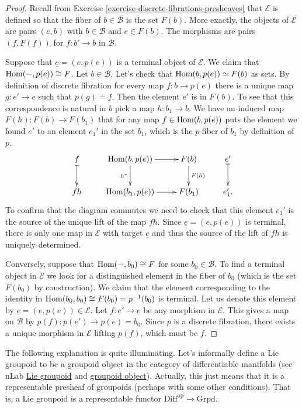 \begin{proof}
Recall from Exercise \ref{exercise-discrete-fibrations-presheaves}
that $\mathcal{E}$ is defined so that the fiber of $b \in \mathcal{B}$ 
is the set $F(b)$. More exactly, the objects of $\mathcal{E}$
are pairs $(e,b)$ with $b \in \mathcal{B}$ and $e \in F(b)$.
The morphisms are pairs $(f,F(f))$ for $f:b' \to b$ in $\mathcal{B}$.

Suppose that $\underline{e}=(e,p(e))$ is a terminal object of $\mathcal{E}$.
We claim that $\mathop{\mathrm{Hom}}\nolimits(-,p(e))\cong F$.
Let $b \in \mathcal{B}$. Let's check that
$\mathop{\mathrm{Hom}}\nolimits(b,p(e))\simeq F(b)$ as sets.
By definition of discrete
fibration for every map $f:b\to p(e)$ 
there is a unique map $g:e' \to e$ such that $p(g)=f$.
Then the element $e'$ is in $F(b)$.
To see that this correspondence is natural in $b$
pick a map $h:b_1 \to b$.
We have an induced map $F(h):F(b) \to F(b_1)$
that for any map $f \in \mathop{\mathrm{Hom}}\nolimits(b,p(e))$
puts the element we found $e'$
to an element $e_1'$ in the set $b_1$,
which is the $p$-fiber of $b_1$ by definition of $p$.
$$
\xymatrix{
f\ar@{|->}[d]&\Hom(b,p(e))\ar[r]\ar[d]_{h^*}&F(b)\ar[d]^{F(h)}&e'\ar@{|->}[d]\\
fh&\Hom(b_1,p(e))\ar[r]&F(b_1)& e_1'.
}
$$
To confirm that the diagram commutes we need to check
that this element $e_1'$ is the source of the unique
lift of the map $fh$. Since $\underline{e}=(e,p(e))$ is terminal,
there is only one map in $\mathcal{E}$
with target $\underline{e}$ and thus 
the source of the lift of $fh$ is uniquely determined.

Conversely, suppose that $\mathop{\mathrm{Hom}}\nolimits(-,b_0)\cong F$ for some $b_0 \in \mathcal{B}$.
To find a terminal object in $\mathcal{E}$ we look
for a distinguished element in the fiber of $b_0$
(which is the set $F(b_0)$ by construction).
We claim that the element corresponding to the identity
in $\mathop{\mathrm{Hom}}\nolimits(b_0,b_0)\cong F(b_0)=p^{-1}(b_0)$
is terminal. Let us denote this element by 
$\underline{e}=(e,p(e)) \in \mathcal{E}$.
Let $f:\underline{e}' \to \underline{e}$ be any morphism in $\mathcal{E}$.
This gives a map on $\mathcal{B}$ by $p(f):p(e')\to p(e)=b_0$.
Since $p$ is a discrete fibration, there exists a unique morphism
in $\mathcal{E}$ lifting $p(f)$, which must be $f$.
\end{proof}

\medskip\noindent
The following explanation is quite illuminating.
Let's informally define a Lie groupoid to be a groupoid object
in the category of differentiable manifolds 
(see nLab \href{url}{Lie groupoid} and
\href{https://ncatlab.org/nlab/show/Lie+groupoid}{groupoid object}).
Actually, this just means that it is a representable
presheaf of groupoids (perhaps with some other conditions).
That is, a Lie groupoid is a representable functor
$\text{Diff}^{\text{op}}\to \text{Grpd}$.

